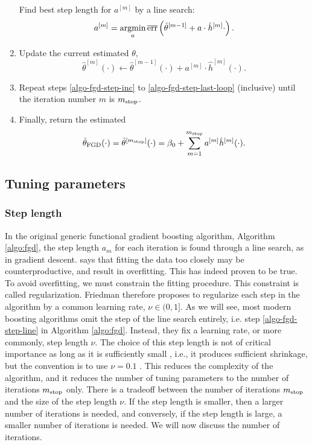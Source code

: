 \begin{algorithm}
\begin{enumerate}
        \label{algo-fgd-step-line}
        Find best step length for $a^{[m]}$ by a line search:
        \begin{equation*}
            a^{[m]}=\operatorname*{argmin}_{a}\overline{\text{err}}\left(\hat{\theta}^{[m-1]}+a\cdot\hat{h}^{[m]}{\cdot}\right).
        \end{equation*}
    \item
        \label{algo-fgd-step-last-loop}
        Update the current estimated $\theta$,
        \begin{equation*}
            \hat{\theta}^{[m]}(\cdot)\gets \hat{\theta}^{[m-1]}(\cdot)+a^{[m]}\cdot \hat{h}^{[m]}(\cdot).
        \end{equation*}
    \item
        Repeat steps \ref{algo-fgd-step-inc} to \ref{algo-fgd-step-last-loop} (inclusive) until the iteration number $m$ is $m_{\text{stop}}$.
    \item
        Finally, return the estimated
        \begin{equation*}
            \hat{\theta}_{\text{FGD}}(\cdot)=\hat{\theta}^{[m_{\text{stop}}]}(\cdot)=\beta_0+\sum_{m=1}^{m_{\text{stop}}}a^{[m]}\hat{h}^{[m]}(\cdot).
        \end{equation*}
\end{enumerate}
\end{algorithm}

\subsection{Tuning parameters}
\subsubsection{Step length}
In the original generic functional gradient boosting algorithm, Algorithm \ref{algo:fgd}, the step length $a_m$ for each iteration is found through a line search, as in gradient descent.
\citet{friedman2001} says that fitting the data too closely may be counterproductive, and result in overfitting.
This has indeed proven to be true.
To avoid overfitting, we must constrain the fitting procedure.
This constraint is called regularization.
Friedman therefore proposes to regularize each step in the algorithm by a common learning rate, $\nu\in(0,1]$.
As we will see, most modern boosting algorithms omit the step of the line search entirely, i.e. step \ref{algo-fgd-step-line} in Algorithm \ref{algo:fgd}.
Instead, they fix a learning rate, or more commonly, step length $\nu$.
The choice of this step length is not of critical importance as long as it is sufficiently small \citep{schmid-hothorn}, i.e., it produces sufficient shrinkage, but the convention is to use $\nu=0.1$ \citep{mayr14a}.
This reduces the complexity of the algorithm, and it reduces the number of tuning parameters to the number of iterations $m_{\text{stop}}$ only.
There is a tradeoff between the number of iterations $m_{\text{stop}}$ and the size of the step length $\nu$.
If the step length is smaller, then a larger number of iterations is needed, and conversely, if the step length is large, a smaller number of iterations is needed.
We will now discuss the number of iterations.

